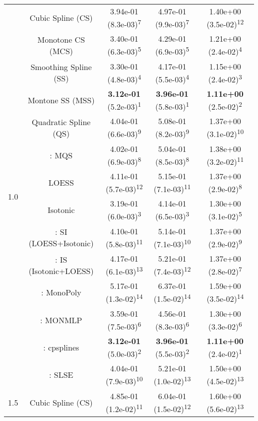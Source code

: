 \begin{tabular}{ccccc}
\midrule
\multirow{14}{*}{1.0}&Cubic Spline (CS)& 3.94e-01 (8.3e-03)\textsuperscript{7}& 4.97e-01 (9.9e-03)\textsuperscript{7}& 1.40e+00 (3.5e-02)\textsuperscript{12}\tabularnewline
&Monotone CS (MCS)& 3.40e-01 (6.3e-03)\textsuperscript{5}& 4.29e-01 (6.9e-03)\textsuperscript{5}& 1.21e+00 (2.4e-02)\textsuperscript{4}\tabularnewline
&Smoothing Spline (SS)& 3.30e-01 (4.8e-03)\textsuperscript{4}& 4.17e-01 (5.5e-03)\textsuperscript{4}& 1.15e+00 (2.4e-02)\textsuperscript{3}\tabularnewline
&Montone SS (MSS)& \textbf{3.12e-01} (5.2e-03)\textsuperscript{1}& \textbf{3.96e-01} (5.8e-03)\textsuperscript{1}& \textbf{1.11e+00} (2.5e-02)\textsuperscript{2}\tabularnewline
&Quadratic Spline (QS)& 4.04e-01 (6.6e-03)\textsuperscript{9}& 5.08e-01 (8.2e-03)\textsuperscript{9}& 1.37e+00 (3.1e-02)\textsuperscript{10}\tabularnewline
&\textcite{heMonotoneBsplineSmoothing1998}: MQS& 4.02e-01 (6.9e-03)\textsuperscript{8}& 5.04e-01 (8.5e-03)\textsuperscript{8}& 1.38e+00 (3.2e-02)\textsuperscript{11}\tabularnewline
&LOESS& 4.11e-01 (5.7e-03)\textsuperscript{12}& 5.15e-01 (7.1e-03)\textsuperscript{11}& 1.37e+00 (2.9e-02)\textsuperscript{8}\tabularnewline
&Isotonic& 3.19e-01 (6.0e-03)\textsuperscript{3}& 4.14e-01 (6.5e-03)\textsuperscript{3}& 1.30e+00 (3.1e-02)\textsuperscript{5}\tabularnewline
&\textcite{mammenEstimatingSmoothMonotone1991}: SI (LOESS+Isotonic)& 4.10e-01 (5.8e-03)\textsuperscript{11}& 5.14e-01 (7.1e-03)\textsuperscript{10}& 1.37e+00 (2.9e-02)\textsuperscript{9}\tabularnewline
&\textcite{mammenEstimatingSmoothMonotone1991}: IS (Isotonic+LOESS)& 4.17e-01 (6.1e-03)\textsuperscript{13}& 5.21e-01 (7.4e-03)\textsuperscript{12}& 1.37e+00 (2.8e-02)\textsuperscript{7}\tabularnewline
&\textcite{murrayFastFlexibleMethods2016a}: MonoPoly& 5.17e-01 (1.3e-02)\textsuperscript{14}& 6.37e-01 (1.5e-02)\textsuperscript{14}& 1.59e+00 (3.5e-02)\textsuperscript{14}\tabularnewline
&\textcite{cannonMonmlpMultilayerPerceptron2017}: MONMLP& 3.59e-01 (7.5e-03)\textsuperscript{6}& 4.56e-01 (8.3e-03)\textsuperscript{6}& 1.30e+00 (3.3e-02)\textsuperscript{6}\tabularnewline
&\textcite{navarro-garciaConstrainedSmoothingOutofrange2023}: cpsplines& \textbf{3.12e-01} (5.0e-03)\textsuperscript{2}& \textbf{3.96e-01} (5.5e-03)\textsuperscript{2}& \textbf{1.11e+00} (2.4e-02)\textsuperscript{1}\tabularnewline
&\textcite{groeneboomConfidenceIntervalsMonotone2023}: SLSE& 4.04e-01 (7.9e-03)\textsuperscript{10}& 5.21e-01 (1.0e-02)\textsuperscript{13}& 1.50e+00 (4.5e-02)\textsuperscript{13}\tabularnewline
\midrule
\multirow{14}{*}{1.5}&Cubic Spline (CS)& 4.85e-01 (1.2e-02)\textsuperscript{11}& 6.04e-01 (1.5e-02)\textsuperscript{12}& 1.60e+00 (5.6e-02)\textsuperscript{13}\tabularnewline

\end{tabular}

